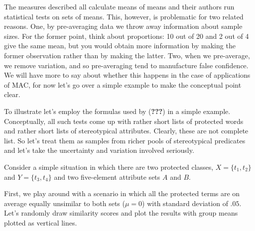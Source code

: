 \documentclass[10pt,dvipsnames,enabledeprecatedfontcommands]{scrartcl}
\begin{document}
The measures described all calculate means of means and their authors
run statistical tests on sets of means. This, however, is problematic
for two related reasons. One, by pre-averaging data we throw away
information about sample sizes. For the former point, think about
proportions: 10 out of 20 and 2 out of 4 give the same mean, but you
would obtain more information by making the former observation rather
than by making the latter. Two, when we pre-average, we remove
variation, and so pre-averaging tend to manufacture false confidence. We
will have more to say about whether this happens in the case of
applications of MAC, for now let's go over a simple example to make the
conceptual point clear.

To illustrate let's employ the formulas used by ({\textbf{???}}) in a
simple example. Conceptually, all such tests come up with rather short
lists of protected words and rather short lists of stereotypical
attributes. Clearly, these are not complete list. So let's treat them as
samples from richer pools of stereotypical predicates and let's take the
uncertainty and variation involved seriously.

Consider a simple situation in which there are two protected classes,
\(X=\{t_1,t_2\}\) and \(Y=\{t_3,t_4\}\) and two five-element attribute
sets \(A\) and \(B\).

First, we play around with a scenario in which all the protected terms
are on average equally unsimilar to both sets (\(\mu =0\)) with standard
deviation of \(.05\). Let's randomly draw similarity scores and plot the
results with group means plotted as vertical lines.

\footnotesize
\end{document}
